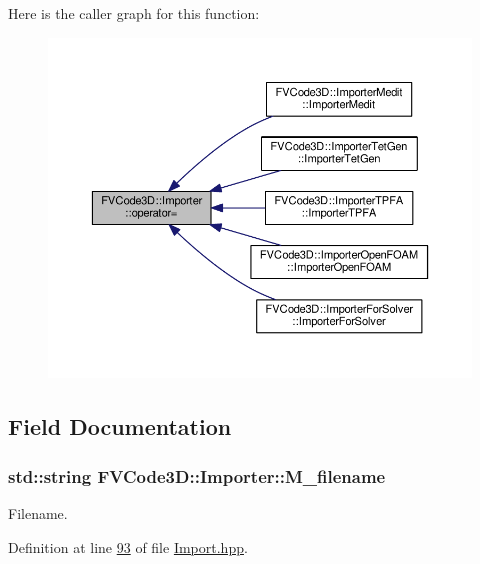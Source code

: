 Here is the caller graph for this function\+:
\nopagebreak
\begin{figure}[H]
\begin{center}
\leavevmode
\includegraphics[width=350pt]{classFVCode3D_1_1Importer_a2559d25ef11c7a21e97bb4d17b51aaaf_icgraph}
\end{center}
\end{figure}




\subsection{Field Documentation}
\subsubsection[{\texorpdfstring{M\+\_\+filename}{M_filename}}]{\setlength{\rightskip}{0pt plus 5cm}std\+::string F\+V\+Code3\+D\+::\+Importer\+::\+M\+\_\+filename\hspace{0.3cm}{\ttfamily [protected]}}\hypertarget{classFVCode3D_1_1Importer_a318e689fb93c5c906f85aa13685724d7}{}\label{classFVCode3D_1_1Importer_a318e689fb93c5c906f85aa13685724d7}


Filename. 



Definition at line \hyperlink{Import_8hpp_source_l00093}{93} of file \hyperlink{Import_8hpp_source}{Import.\+hpp}.

